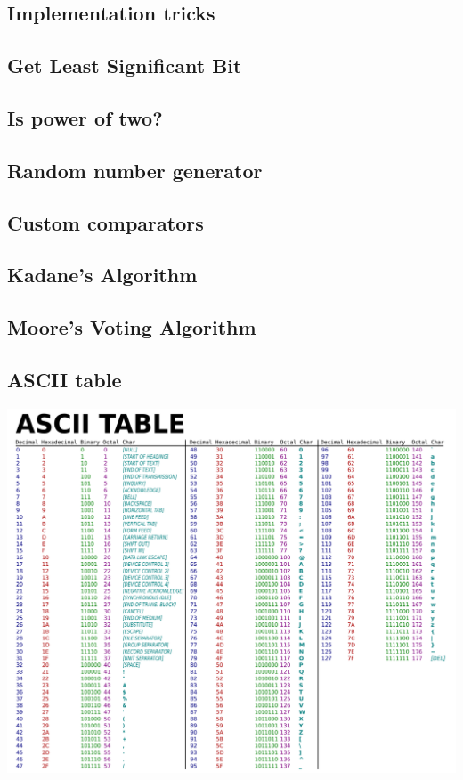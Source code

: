 \documentclass[10pt]{article}
\begin{document}
\begin{multicols*}{2}
\subsection{Implementation tricks}


\subsection{Get Least Significant Bit}


\subsection{Is power of two?}


\subsection{Random number generator}


\subsection{Custom comparators}


\subsection{Kadane's Algorithm}


\subsection{Moore's Voting Algorithm}


\subsection{ASCII table}
\includegraphics[width=0.8\linewidth]{img/ASCII-Table.png}


\end{multicols*}
\end{document}

